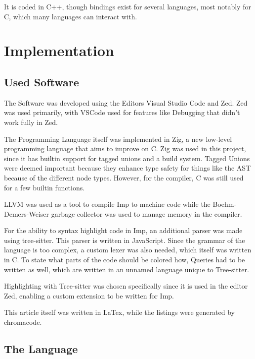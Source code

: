 \documentclass[12pt]{article}
\newcommand{\importListing}[1]{
    \begin{minipage}{\linewidth}
    
    \end{minipage}
}
\begin{document}
It is coded in C++, though bindings exist for several languages, most notably
for C, which many languages can interact with.

\section{Implementation}

\subsection{Used Software}

The Software was developed using the Editors Visual Studio Code and Zed.
Zed was used primarily, with VSCode used for features like Debugging
that didn't work fully in Zed.

The Programming Language itself was implemented in Zig, a new low-level programming
language that aims to improve on C. Zig was used in this project, since it has builtin
support for tagged unions and a build system. Tagged Unions were deemed important because they
enhance type safety for things like the AST because of the different node types.
However, for the compiler, C was still used for
a few builtin functions.

LLVM was used as a tool to compile Imp to machine code while the
Boehm-Demers-Weiser garbage collector \autocite{GarbageCollector} was
used to manage memory in the compiler.

For the ability to syntax highlight code in Imp, an additional parser was made using tree-sitter.
This parser is written in JavaScript. Since the grammar of the language is too complex,
a custom lexer was also needed, which itself was written in C.
To state what parts of the code should be colored how, Queries had to be written as well,
which are written in an unnamed language unique to Tree-sitter.

Highlighting with Tree-sitter was chosen specifically since it is used
in the editor Zed, enabling a custom extension to be written for Imp.

This article itself was written in LaTex, while the listings were generated
by chromacode\autocite{lebedaTomLebedaChroma_code2025}.


\subsection{The Language}
\importListing{code/either.tex}
\importListing{code/foldl.tex}
\end{document}
